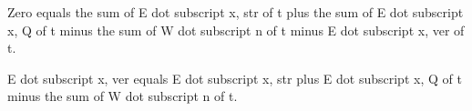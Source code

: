 Zero equals the sum of E dot subscript x, str of t plus the sum of E dot subscript x, Q of t minus the sum of W dot subscript n of t minus E dot subscript x, ver of t.

E dot subscript x, ver equals E dot subscript x, str plus E dot subscript x, Q of t minus the sum of W dot subscript n of t.